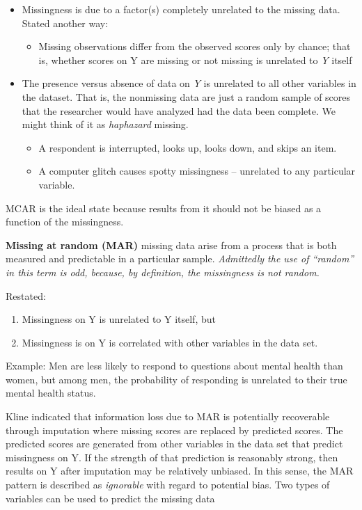 \documentclass[
  english,
]{book}
\providecommand{\tightlist}{%
  \setlength{\itemsep}{0pt}\setlength{\parskip}{0pt}}
\begin{document}
\begin{itemize}
\tightlist
\item
  Missingness is due to a factor(s) completely unrelated to the missing data. Stated another way:

  \begin{itemize}
  \tightlist
  \item
    Missing observations differ from the observed scores only by chance; that is, whether scores on Y are missing or not missing is unrelated to \emph{Y} itself
  \end{itemize}
\item
  The presence versus absence of data on \emph{Y} is unrelated to all other variables in the dataset. That is, the nonmissing data are just a random sample of scores that the researcher would have analyzed had the data been complete. We might think of it as \emph{haphazard} missing.

  \begin{itemize}
  \tightlist
  \item
    A respondent is interrupted, looks up, looks down, and skips an item.
  \item
    A computer glitch causes spotty missingness -- unrelated to any particular variable.
  \end{itemize}
\end{itemize}

MCAR is the ideal state because results from it should not be biased as a function of the missingness.

\textbf{Missing at random (MAR)} missing data arise from a process that is both measured and predictable in a particular sample. \emph{Admittedly the use of ``random'' in this term is odd, because, by definition, the missingness is not random.}

Restated:

\begin{enumerate}
\def\labelenumi{\arabic{enumi}.}
\tightlist
\item
  Missingness on Y is unrelated to Y itself, but
\item
  Missingness is on Y is correlated with other variables in the data set.
\end{enumerate}

Example: Men are less likely to respond to questions about mental health than women, but among men, the probability of responding is unrelated to their true mental health status.

Kline \citeyearpar{kline_principles_2016} indicated that information loss due to MAR is potentially recoverable through imputation where missing scores are replaced by predicted scores. The predicted scores are generated from other variables in the data set that predict missingness on Y. If the strength of that prediction is reasonably strong, then results on Y after imputation may be relatively unbiased. In this sense, the MAR pattern is described as \emph{ignorable} with regard to potential bias. Two types of variables can be used to predict the missing data
\end{document}
